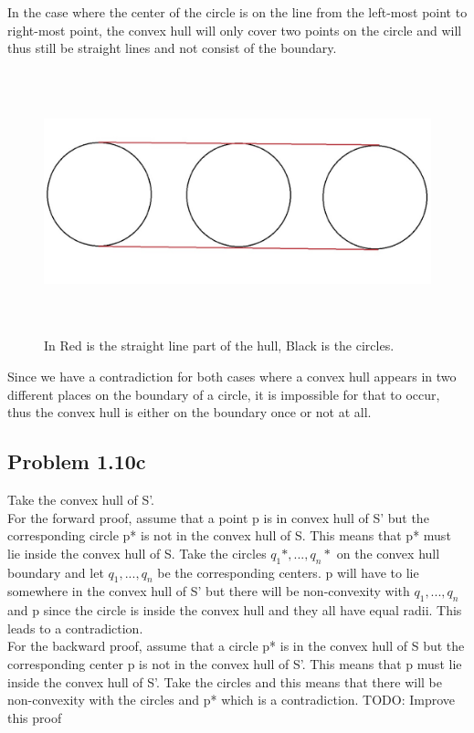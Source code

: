 \documentclass[11pt,psfig]{article}
\begin{document}
In the case where the center of the circle is on the line from the left-most point to right-most point, the convex hull will only cover two points on the circle and will thus still be straight lines and not consist of the boundary.
\begin{figure}[H]
\centering
\includegraphics[height=3in]{hw1prob1-10b_2.jpg}
\caption{In Red is the straight line part of the hull, Black is the circles.}
\end{figure}
Since we have a contradiction for both cases where a convex hull appears in two different places on the boundary of a circle, it is impossible for that to occur, thus the convex hull is either on the boundary once or not at all. 

\subsection*{Problem 1.10c}

Take the convex hull of S'. \\
For the forward proof, assume that a point p is in convex hull of S' but the corresponding circle p* is not in the convex hull of S. This means that p* must lie inside the convex hull of S. Take the circles $q_1*,...,q_n*$ on the convex hull boundary and let $q_1,...,q_n$ be the corresponding centers. p will have to lie somewhere in the convex hull of S' but there will be non-convexity with $q_1,...,q_n$ and p since the circle is inside the convex hull and they all have equal radii. This leads to a contradiction. \\
For the backward proof, assume that a circle p* is in the convex hull of S but the corresponding center p is not in the convex hull of S'. This means that p must lie inside the convex hull of S'. Take the circles and this means that there will be non-convexity with the circles and p* which is a contradiction.
TODO: Improve this proof
\end{document}
